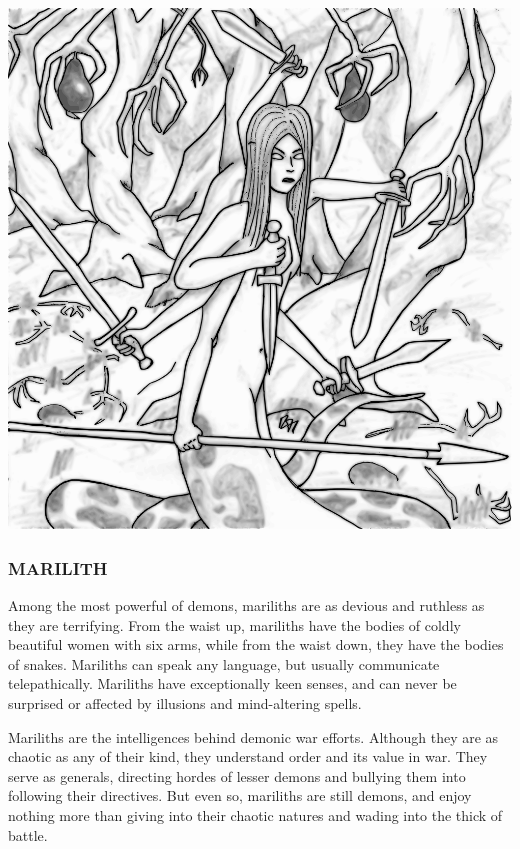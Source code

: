 \begin{multicols}{2}
\vspace{1em}

\noindent\includegraphics[width=\columnwidth]{marilith.pdf}\label{marilith}

\subsubsection{MARILITH}

Among the most powerful of demons, mariliths are as devious and ruthless as they are terrifying. From the waist up, mariliths have the bodies of coldly beautiful women with six arms, while from the waist down, they have the bodies of snakes. Mariliths can speak any language, but usually communicate telepathically. Mariliths have exceptionally keen senses, and can never be surprised or affected by illusions and mind-altering spells.

Mariliths are the intelligences behind demonic war efforts. Although they are as chaotic as any of their kind, they understand order and its value in war. They serve as generals, directing hordes of lesser demons and bullying them into following their directives. But even so, mariliths are still demons, and enjoy nothing more than giving into their chaotic natures and wading into the thick of battle.


\end{multicols}
